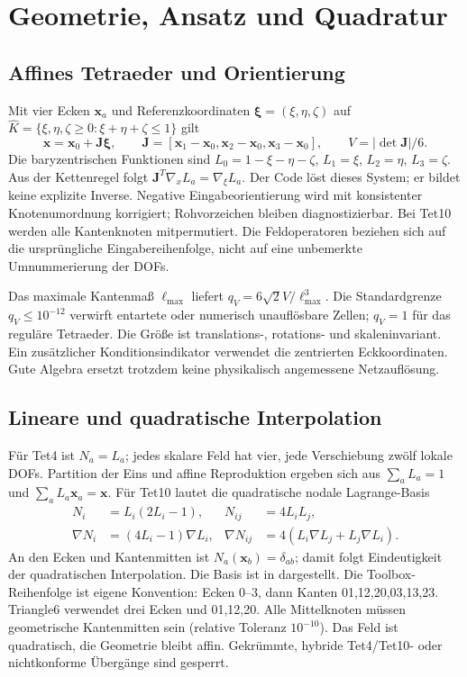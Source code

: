 \chapter{Geometrie, Ansatz und Quadratur}\label{chap:geometry}
\section{Affines Tetraeder und Orientierung}
Mit vier Ecken $\mathbf x_a$ und Referenzkoordinaten
$\boldsymbol\xi=(\xi,\eta,\zeta)$ auf
$\hat K=\{\xi,\eta,\zeta\ge0:\xi+\eta+\zeta\le1\}$ gilt
\begin{equation}\label{eq:affine}
\mathbf x=\mathbf x_0+\mathbf J\boldsymbol\xi,\qquad
\mathbf J=[\mathbf x_1-\mathbf x_0,\mathbf x_2-\mathbf x_0,
\mathbf x_3-\mathbf x_0],\qquad V=|\det\mathbf J|/6.
\end{equation}
Die baryzentrischen Funktionen sind
$L_0=1-\xi-\eta-\zeta$, $L_1=\xi$, $L_2=\eta$, $L_3=\zeta$.
Aus der Kettenregel folgt $\mathbf J^T\nabla_x L_a=\nabla_\xi L_a$.
Der Code löst dieses System; er bildet keine explizite Inverse.
Negative Eingabeorientierung wird mit konsistenter Knotenumordnung korrigiert;
Rohvorzeichen bleiben diagnostizierbar. Bei Tet10 werden alle Kantenknoten
mitpermutiert. Die Feldoperatoren beziehen sich auf die ursprüngliche
Eingabereihenfolge, nicht auf eine unbemerkte Umnummerierung der DOFs.

Das maximale Kantenmaß $\ell_{\max}$ liefert
$q_V=6\sqrt2 V/\ell_{\max}^3$. Die Standardgrenze $q_V\le10^{-12}$ verwirft
entartete oder numerisch unauflösbare Zellen; $q_V=1$ für das reguläre
Tetraeder. Die Größe ist translations-, rotations- und skaleninvariant.
Ein zusätzlicher Konditionsindikator verwendet die zentrierten Eckkoordinaten.
Gute Algebra ersetzt trotzdem keine physikalisch angemessene Netzauflösung.

\section{Lineare und quadratische Interpolation}
Für Tet4 ist $N_a=L_a$; jedes skalare Feld hat vier, jede Verschiebung zwölf
lokale DOFs. Partition der Eins und affine Reproduktion ergeben sich aus
$\sum_a L_a=1$ und $\sum_a L_a\mathbf x_a=\mathbf x$.
Für Tet10 lautet die quadratische nodale Lagrange-Basis
\begin{align}\label{eq:tet10shape}
N_i&=L_i(2L_i-1),&N_{ij}&=4L_iL_j,\\
\nabla N_i&=(4L_i-1)\nabla L_i,&
\nabla N_{ij}&=4(L_i\nabla L_j+L_j\nabla L_i).\nonumber
\end{align}
An den Ecken und Kantenmitten ist $N_a(\mathbf x_b)=\delta_{ab}$; damit folgt
Eindeutigkeit der quadratischen Interpolation. Die Basis ist in
\cite{defelement-p2} dargestellt. Die Toolbox-Reihenfolge ist eigene Konvention:
Ecken 0--3, dann Kanten 01,12,20,03,13,23. Triangle6 verwendet drei Ecken
und 01,12,20. Alle Mittelknoten müssen geometrische Kantenmitten sein
(relative Toleranz $10^{-10}$). Das Feld ist quadratisch, die Geometrie bleibt
affin. Gekrümmte, hybride Tet4/Tet10- oder nichtkonforme Übergänge sind gesperrt.

